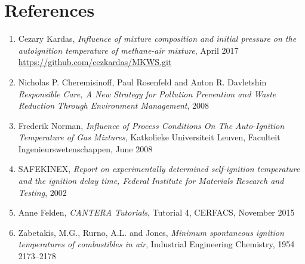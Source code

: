 \documentclass[a4paper,11pt]{article}
\begin{document}
    \section{References}
    
\begin{enumerate}
\item  Cezary Kardas, \textit{Influence of mixture composition and initial pressure on the autoignition temperature of methane-air mixture}, April 2017 \url{https://github.com/cezkardas/MKWS.git}

\item  Nicholas P. Cheremisinoff, Paul Rosenfeld and Anton R. Davletshin \textit{Responsible Care,
A New Strategy for Pollution Prevention and Waste Reduction Through Environment Management}, 2008

\item  Frederik Norman, \textit{Influence of Process Conditions On The Auto-Ignition Temperature of Gas Mixtures}, Katkolieke Universiteit Leuven, Faculteit Ingenieurswetenschappen, June 2008

\item SAFEKINEX, \textit{Report on experimentally determined self-ignition temperature and the ignition delay time, Federal Institute for Materials Research and Testing}, 2002 
\item Anne Felden, \textit{CANTERA Tutorials}, Tutorial 4, CERFACS, November 2015 

\item Zabetakis, M.G., Rurno, A.L. and Jones, \textit{Minimum spontaneous
ignition temperatures of combustibles in air}, Industrial Engineering Chemistry, 1954
2173–2178
\end{enumerate}
    
\end{document}
